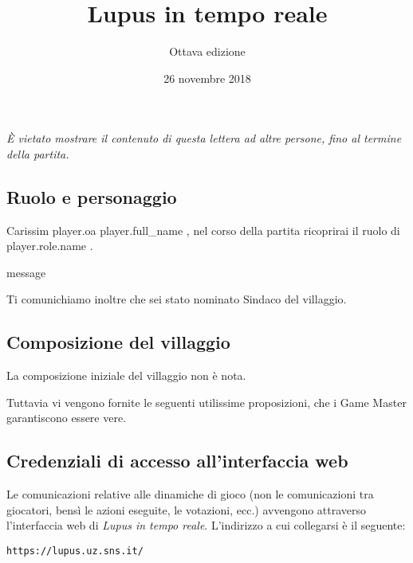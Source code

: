 \documentclass[a4paper,10pt]{article}
\title{Lupus in tempo reale}
\author{Ottava edizione}
\date{26 novembre 2018}
\begin{document}

\maketitle

\emph{È vietato mostrare il contenuto di questa lettera ad altre persone, fino al termine della partita.}


\subsection*{Ruolo e personaggio}
Carissim{{ player.oa }} {{ player.full_name }}, nel corso della partita ricoprirai il ruolo di {{ player.role.name }}.

{%

{%
    {%
        {{ message }}
    {%
{%

{%
    Ti comunichiamo inoltre che sei stato nominato Sindaco del villaggio.
{%


\subsection*{Composizione del villaggio}
La composizione iniziale del villaggio non è nota.
{%
Tuttavia vi vengono fornite le seguenti utilissime proposizioni, che i Game Master garantiscono essere vere.
\nopagebreak
{}
{%



\subsection*{Credenziali di accesso all'interfaccia web}

Le comunicazioni relative alle dinamiche di gioco (non le comunicazioni tra giocatori, bensì le azioni eseguite, le votazioni, ecc.) avvengono attraverso l'interfaccia web di \emph{Lupus in tempo reale}.
L'indirizzo a cui collegarsi è il seguente:
\nopagebreak
\begin{center}
    \verb|https://lupus.uz.sns.it/|
\end{center}

}}}}}}}}}
\end{document}
